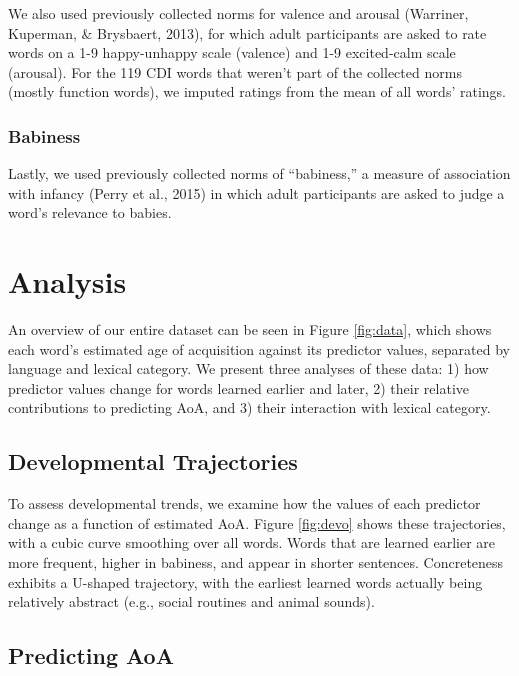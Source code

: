 \documentclass[10pt, letterpaper]{article}
\begin{document}
We also used previously collected norms for valence and arousal
(Warriner, Kuperman, \& Brysbaert, 2013), for which adult participants
are asked to rate words on a 1-9 happy-unhappy scale (valence) and 1-9
excited-calm scale (arousal). For the 119 CDI words that weren't part of
the collected norms (mostly function words), we imputed ratings from the
mean of all words' ratings.

\subsubsection{Babiness}\label{babiness}

Lastly, we used previously collected norms of ``babiness,'' a measure of
association with infancy (Perry et al., 2015) in which adult
participants are asked to judge a word's relevance to babies.

\section{Analysis}\label{analysis}

An overview of our entire dataset can be seen in Figure \ref{fig:data},
which shows each word's estimated age of acquisition against its
predictor values, separated by language and lexical category. We present
three analyses of these data: 1) how predictor values change for words
learned earlier and later, 2) their relative contributions to predicting
AoA, and 3) their interaction with lexical category.

\subsection{Developmental
Trajectories}\label{developmental-trajectories}

To assess developmental trends, we examine how the values of each
predictor change as a function of estimated AoA. Figure \ref{fig:devo}
shows these trajectories, with a cubic curve smoothing over all words.
Words that are learned earlier are more frequent, higher in babiness,
and appear in shorter sentences. Concreteness exhibits a U-shaped
trajectory, with the earliest learned words actually being relatively
abstract (e.g., social routines and animal sounds).

\subsection{Predicting AoA}\label{predicting-aoa}
\end{document}
